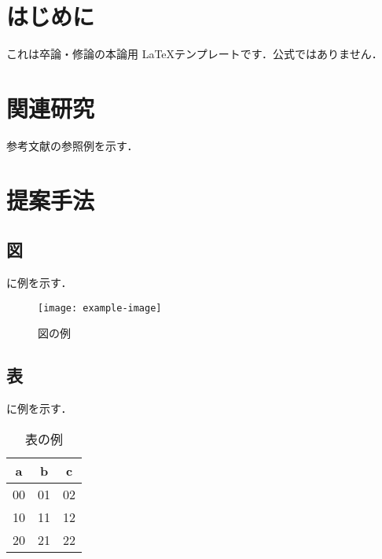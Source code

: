 \documentclass[dvipdfmx]{thesis}
\begin{document}
\makethesistitle[
type={卒業論文},
organization={砂大学},
division={砂部砂学科},
title={論文のタイトル\\サブタイトル},
studentnumber={B99T9999Z},
author={鳥取 太郎},
date={令和6年2月},
]
\maketableofcontents
\chapter{はじめに}
これは卒論・修論の本論用 \LaTeX テンプレートです．公式ではありません．
\chapter{関連研究}
参考文献の参照例を示す\cite{Article:2024:Sunadai}．
\chapter{提案手法}
\section{図}
に例を示す．

\begin{figure}[h]
  \centering
  \texttt{[image: example-image]}
  \caption{図の例}
  \label{fig:example-image-1}
\end{figure}

\section{表}
に例を示す．

\begin{table}[h]
  \centering
  \caption{表の例}
  \begin{tabular}{|c c c|}
    a & b & c \\
    \hline
    00 & 01 & 02 \\ 
    10 & 11 & 12 \\ 
    20 & 21 & 22 \\ 
  \end{tabular}
  \label{tab:example-example}
\end{table}
\end{document}
